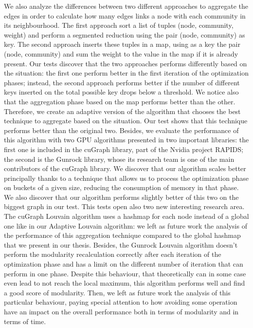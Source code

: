 We also analyze the differences between two different approaches to aggregate the edges in order to calculate how many edges links a node with each community in its neighbourhood. The first approach sort a list of tuples (node, community, weight) and perform a segmented reduction using the pair (node, community) as key. The second approach inserts these tuples in a map, using as a key the pair (node, community) and sum the weight to the value in the map if it is already present. Our tests discover that the two approaches performs differently based on the situation: the first one perform better in the first iteration of the optimization phases; instead, the second approach performs better if the number of different keys inserted on the total possible key drops below a threshold. We notice also that the aggregation phase based on the map performs better than the other. Therefore, we create an adaptive version of the algorithm that chooses the best technique to aggregate based on the situation. Our test shows that this technique performs better than the original two. Besides, we evaluate the performance of this algorithm with two GPU algorithms presented in two important libraries: the first one is included in the cuGraph library, part of the Nvidia project RAPIDS; the second is the Gunrock library, whose its research team is one of the main contributors of the cuGraph library. We discover that our algorithm scales better principally thanks to a technique that allows us to process the optimization phase on buckets of a given size, reducing the consumption of memory in that phase. We also discover that our algorithm performs slightly better of this two on the biggest graph in our test. This tests open also two new interesting research area. The cuGraph Louvain algorithm uses a hashmap for each node instead of a global one like in our Adaptive Louvain algorithm: we left as future work the analysis of the performance of this aggregation technique compared to the global hashmap that we present in our thesis. Besides, the Gunrock Louvain algorithm doesn't perform the modularity recalculation correctly after each iteration of the optimization phase and has a limit on the different number of iteration that can perform in one phase. Despite this behaviour, that theoretically can in some case even lead to not reach the local maximum, this algorithm performs well and find a good score of modularity. Then, we left as future work the analysis of this particular behaviour, paying special attention to how avoiding some operation have an impact on the overall performance both in terms of modularity and in terms of time. 